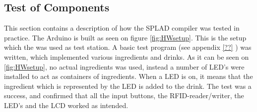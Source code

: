 \subsection{Test of Components}
This section contains a description of how the SPLAD compiler was tested in practice. The Arduino is built as seen on figure \ref{fig:HWsetup}. This is the setup which the was used as test station. A basic test program (see appendix \ref{??} ) was written, which implemented various ingredients and drinks. As it can be seen on \ref{fig:HWsetup}, no actual ingredients was used, instead a number of LED's were installed to act as containers of ingredients. When a LED is on, it means that the ingredient which is represented by the LED is added to the drink. The test was a success, and confirmed that all the input buttons, the RFID-reader/writer, the LED's and the LCD worked as intended. 